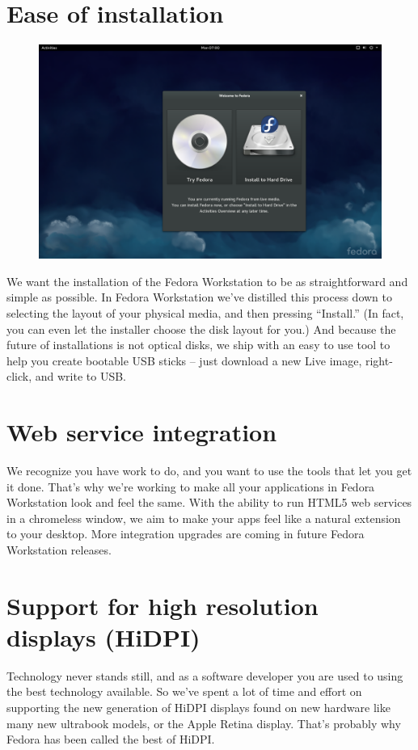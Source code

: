 \documentclass[
a4paper,
10pt
]{leaflet}
\begin{document}
\section{\textcolor{FedoraBlue}{Ease of installation}}
\begin{figure}[h]
  \includegraphics[keepaspectratio,width=\textwidth]{Workstation-anaconda-0.png}
\end{figure}
We want the installation of the Fedora Workstation to be as straightforward and simple as possible. In Fedora Workstation we've distilled this process down to selecting the layout of your physical media, and then pressing ``Install.'' (In fact, you can even let the installer choose the disk layout for you.) And because the future of installations is not optical disks, we ship with an easy to use tool to help you create bootable USB sticks -- just download a new Live image, right-click, and write to USB.

\section{\textcolor{FedoraBlue}{Web service integration}}
We recognize you have work to do, and you want to use the tools that let you get it done. That's why we’re working to make all your applications in Fedora Workstation look and feel the same. With the ability to run HTML5 web services in a chromeless window, we aim to make your apps feel like a natural extension to your desktop. More integration upgrades are coming in future Fedora Workstation releases.

\section{\textcolor{FedoraBlue}{Support for high resolution displays (HiDPI)}}
Technology never stands still, and as a software developer you are used to using the best technology available. So we've spent a lot of time and effort on supporting the new generation of HiDPI displays found on new hardware like many new ultrabook models, or the Apple Retina display. That's probably why Fedora has been called the best of HiDPI.
\end{document}
